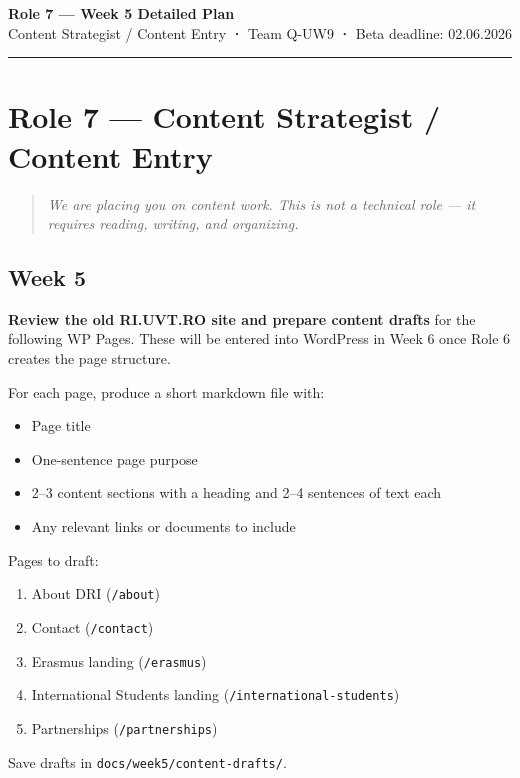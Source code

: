 \documentclass[11pt,a4paper]{article}
\begin{document}
\begin{center}
    {\Large\bfseries\color{uvtBlue} Role 7 — Week 5 Detailed Plan}\\[0.4em]
    {\small Content Strategist / Content Entry \textbf{·} Team Q-UW9 \textbf{·} Beta deadline: 02.06.2026}
\end{center}
\vspace{0.3em}
\textcolor{uvtYellow}{\rule{\linewidth}{2pt}}
\vspace{0.8em}
\section{Role 7 — Content Strategist / Content Entry}

\begin{quote}\itshape
We are placing you on content work. This is not a technical role — it requires reading, writing, and organizing.
\end{quote}

\subsection{Week 5}

\textbf{Review the old RI.UVT.RO site and prepare content drafts} for the following WP Pages. These will be entered into WordPress in Week 6 once Role 6 creates the page structure.

For each page, produce a short markdown file with:
\begin{itemize}
\item Page title
\item One-sentence page purpose
\item 2–3 content sections with a heading and 2–4 sentences of text each
\item Any relevant links or documents to include
\end{itemize}

Pages to draft:
\begin{enumerate}
\item About DRI (\nolinkurl{/about})
\item Contact (\nolinkurl{/contact})
\item Erasmus landing (\nolinkurl{/erasmus})
\item International Students landing (\nolinkurl{/international-students})
\item Partnerships (\nolinkurl{/partnerships})
\end{enumerate}

Save drafts in \nolinkurl{docs/week5/content-drafts/}.
\end{document}
